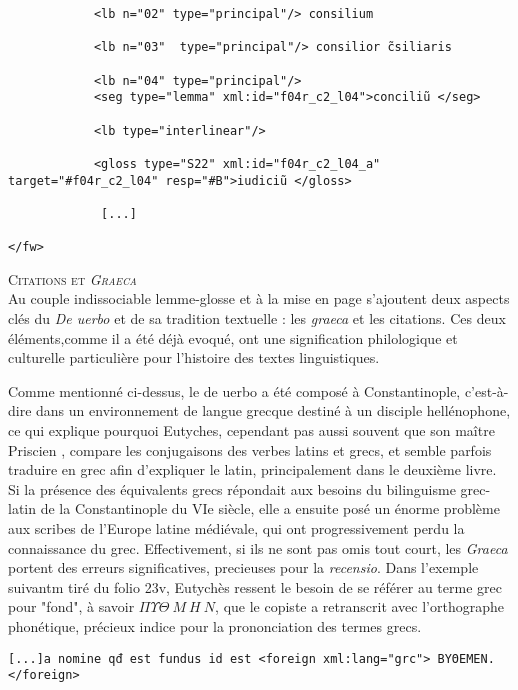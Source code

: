 \documentclass[a4paper, twoside, 12pt]{book}
\begin{document}
\begin{verbatim}
            <lb n="02" type="principal"/> consilium 
                                    
            <lb n="03"  type="principal"/> consilior c̃siliaris
                                    
            <lb n="04" type="principal"/>
            <seg type="lemma" xml:id="f04r_c2_l04">conciliũ </seg>
                              
            <lb type="interlinear"/>
            
            <gloss type="S22" xml:id="f04r_c2_l04_a" target="#f04r_c2_l04" resp="#B">iudiciũ </gloss> 
            
             [...]
            
</fw>

\end{verbatim}

\textsc{Citations et \textit{Graeca}}\\

Au couple indissociable lemme-glosse et à la mise en page s'ajoutent deux aspects clés du \textit{De uerbo} et de sa tradition textuelle : les \textit{graeca} et les citations. Ces deux éléments,comme il a été déjà evoqué, ont une signification philologique et culturelle particulière pour l'histoire des textes linguistiques. 

Comme mentionné ci-dessus, le de uerbo a été composé à Constantinople, c'est-à-dire dans un environnement de langue grecque destiné à un disciple hellénophone, ce qui explique pourquoi Eutyches, cependant pas aussi souvent que son maître Priscien , compare les conjugaisons des verbes latins et grecs, et semble parfois traduire en grec afin d'expliquer le latin, principalement dans le deuxième livre. Si la présence des équivalents grecs répondait aux besoins du bilinguisme grec-latin de la Constantinople du VIe siècle, elle a ensuite posé un énorme problème aux scribes de l'Europe latine médiévale, qui ont progressivement perdu la connaissance du grec. Effectivement, si ils ne sont pas omis tout court, les \textit{Graeca} portent des erreurs significatives, precieuses pour la \textit{recensio}. Dans l'exemple suivantm tiré du folio 23v, Eutychès ressent le besoin de se référer au terme grec pour "fond", à savoir $\Pi \Upsilon \Theta \ M\ H\ N$, que le copiste a retranscrit avec l'orthographe phonétique, précieux indice pour la prononciation des termes grecs. \\ 

\begin{verbatim}
[...]a nomine qđ est fundus id est <foreign xml:lang="grc"> ΒΥΘΕΜΕΝ.</foreign>
\end{verbatim}
\end{document}
